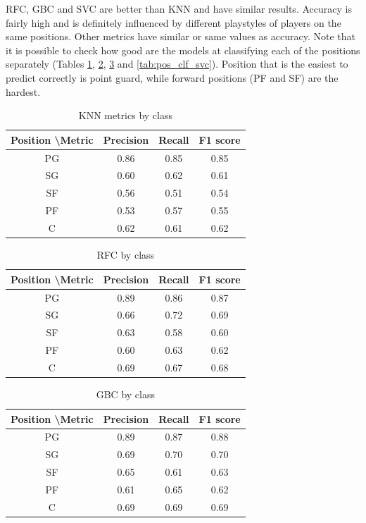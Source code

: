 \documentclass[a4paper]{article}
\begin{document}
RFC, GBC and SVC are better than KNN and have similar results. Accuracy is fairly high and is definitely influenced by different playstyles of players on the same positions. Other metrics have similar or same values as accuracy. Note that it is possible to check how good are the models at classifying each of the positions separately (Tables \ref{tab:pos_clf_knn}, \ref{tab:pos_clf_rfc}, \ref{tab:pos_clf_gbc} and \ref{tab:pos_clf_svc}). 
Position that is the easiest to predict correctly is point guard, while forward positions (PF and SF) are the hardest.

\begin{table}[!h]
\begin{center}
\begin{tabular}{|c|c|c|c|} \hline
Position \textbackslash Metric & Precision & Recall & F1 score \\ \hline
PG & 0.86 & 0.85 & 0.85 \\ \hline
SG & 0.60 & 0.62 & 0.61 \\ \hline
SF & 0.56 & 0.51 & 0.54 \\ \hline
PF & 0.53 & 0.57 & 0.55 \\ \hline
C & 0.62 & 0.61 & 0.62 \\ \hline
\end{tabular}
\caption{KNN metrics by class}
\label{tab:pos_clf_knn}
\end{center}
\end{table}

\begin{table}[!h]
\begin{center}
\begin{tabular}{|c|c|c|c|} \hline
Position \textbackslash Metric & Precision & Recall & F1 score \\ \hline
PG & 0.89 & 0.86 & 0.87 \\ \hline
SG & 0.66 & 0.72 & 0.69 \\ \hline
SF & 0.63 & 0.58 & 0.60 \\ \hline
PF & 0.60 & 0.63 & 0.62 \\ \hline
C & 0.69 & 0.67 & 0.68 \\ \hline
\end{tabular}
\caption{RFC by class}
\label{tab:pos_clf_rfc}
\end{center}
\end{table}

\begin{table}[!h]
\begin{center}
\begin{tabular}{|c|c|c|c|} \hline
Position \textbackslash Metric & Precision & Recall & F1 score \\ \hline
PG & 0.89 & 0.87 & 0.88 \\ \hline
SG & 0.69 & 0.70 & 0.70 \\ \hline
SF & 0.65 & 0.61 & 0.63 \\ \hline
PF & 0.61 & 0.65 & 0.62 \\ \hline
C & 0.69 & 0.69 & 0.69 \\ \hline
\end{tabular}
\caption{GBC by class}
\label{tab:pos_clf_gbc}
\end{center}
\end{table}
\end{document}
